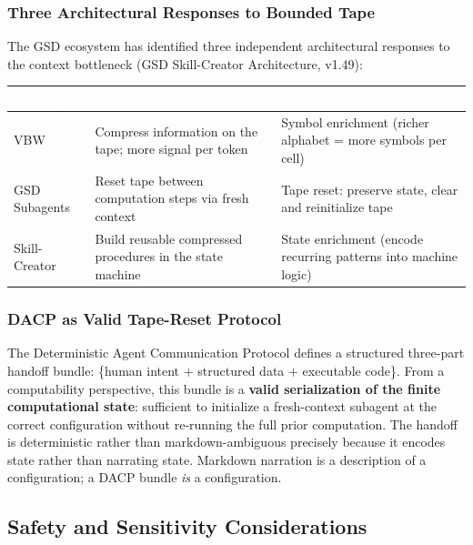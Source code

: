 \documentclass[11pt,letterpaper]{article}
\newcommand{\tableheader}[1]{\textbf{\sffamily\textcolor{white}{#1}}}
\begin{document}
\subsubsection{Three Architectural Responses to Bounded Tape}

The GSD ecosystem has identified three independent architectural responses to the context bottleneck (GSD Skill-Creator Architecture, v1.49):

\begin{center}
\begin{tabularx}{\textwidth}{L{2.5cm}L{4cm}X}
\toprule
{}
\tableheader{Strategy} & \tableheader{Mechanism} & \tableheader{Shannon Analogy} \\
\midrule
VBW & Compress information on the tape; more signal per token & Symbol enrichment (richer alphabet = more symbols per cell) \\
GSD Subagents & Reset tape between computation steps via fresh context & Tape reset: preserve state, clear and reinitialize tape \\
Skill-Creator & Build reusable compressed procedures in the state machine & State enrichment (encode recurring patterns into machine logic) \\
\bottomrule
\end{tabularx}
\end{center}

\subsubsection{DACP as Valid Tape-Reset Protocol}

The Deterministic Agent Communication Protocol defines a structured three-part handoff bundle: \{human intent $+$ structured data $+$ executable code\}. From a computability perspective, this bundle is a \textbf{valid serialization of the finite computational state}: sufficient to initialize a fresh-context subagent at the correct configuration without re-running the full prior computation. The handoff is deterministic rather than markdown-ambiguous precisely because it encodes state rather than narrating state. Markdown narration is a description of a configuration; a DACP bundle \textit{is} a configuration.

\subsection{Safety and Sensitivity Considerations}
\end{document}
